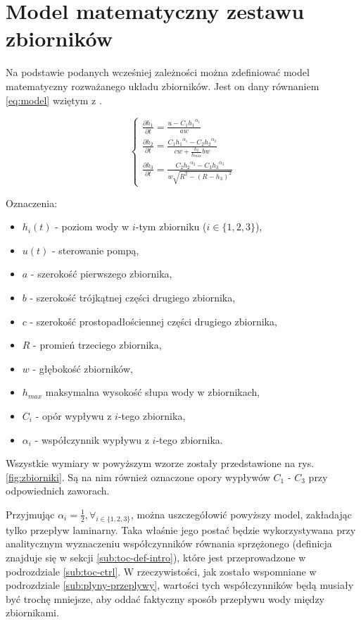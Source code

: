 \section{Model matematyczny zestawu zbiorników}
\label{sec:model}

Na podstawie podanych wcześniej zależności można zdefiniować model matematyczny rozważanego układu zbiorników.
Jest on dany równaniem \ref{eq:model} wziętym z \cite{TanksManual}.

\begin{equation}\label{eq:model}
\left \{
\begin{array}{lr}
\frac{\partial h_{1}}{\partial t} = \frac{u - C_{1}{h_{1}}^{\alpha_{1}}}{aw} \\[8pt]
\frac{\partial h_{2}}{\partial t} = \frac{C_{1}{h_{1}}^{\alpha_{1}} -  C_{2}{h_{2}}^{\alpha_{2}}}{cw + \frac{h_{2}}{h_{max}}bw} \\[20pt]
\frac{\partial h_{3}}{\partial t} = \frac{C_{2}{h_{2}}^{\alpha_{2}} -  C_{3}{h_{3}}^{\alpha_{3}}}{w\sqrt{R^{2} - (R - h_{3})^{2}}}
\end{array}
\right.
\end{equation}

Oznaczenia:
\begin{itemize}
    \item $h_{i}(t)$ - poziom wody w $i$-tym zbiorniku ($i \in \{1, 2, 3\}$),
    \item $u(t)$ - sterowanie pompą,
    \item $a$ - szerokość pierwszego zbiornika,
    \item $b$ - szerokość trójkątnej części drugiego zbiornika,
    \item $c$ - szerokość prostopadłościennej części drugiego zbiornika,
    \item $R$ - promień trzeciego zbiornika,
    \item $w$ - głębokość zbiorników,
    \item $h_{max}$ maksymalna wysokość słupa wody w zbiornikach,
    \item $C_{i}$ - opór wypływu z $i$-tego zbiornika,
    \item $\alpha_{i}$ - współczynnik wypływu z $i$-tego zbiornika.
\end{itemize}

Wszystkie wymiary w powyższym wzorze zostały przedstawione na rys. \ref{fig:zbiorniki}. Są na nim również oznaczone opory wypływów $C_{1}$ - $C_{3}$ przy odpowiednich zaworach.

Przyjmując $\alpha_{i} = \frac{1}{2}, \forall_{i \in \{1, 2, 3\}}$, można uszczegółowić powyższy model, zakładając tylko przepływ laminarny.
Taka właśnie jego postać będzie wykorzystywana przy analitycznym wyznaczeniu współczynników równania sprzężonego (definicja znajduje się w sekcji \ref{sub:toc-def-intro}), które jest przeprowadzone w podrozdziale \ref{sub:toc-ctrl}.
W rzeczywistości, jak zostało wspomniane w podrozdziale \ref{sub:plyny-przeplywy}, wartości tych współczynników będą musiały być trochę mniejsze, aby oddać faktyczny sposób przepływu wody między zbiornikami.

